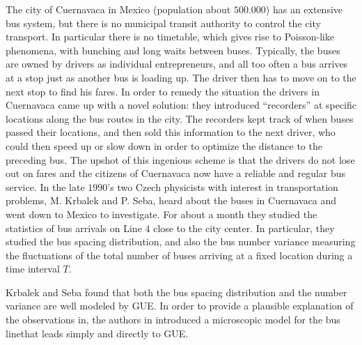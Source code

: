
The city of Cuernavaca in Mexico (population about $500.000$) has an extensive bus system, but there is no municipal transit authority to control the city transport. In particular there is no timetable, which gives rise to Poisson-like phenomena, with bunching and long waits between buses. Typically, the buses are owned by drivers as individual entrepreneurs, and all too often a bus arrives at a stop just as another bus is loading up. The driver then has to move on to the next stop to find his fares. In order to remedy the situation the drivers in Cuernavaca came up with a novel solution: they introduced “recorders” at specific locations along the bus routes in the city. The recorders kept track of when buses passed their locations, and then sold this information to the next driver, who could then speed up or slow down in order to optimize the distance to the preceding bus. The upshot of this ingenious scheme is that the drivers do not lose out on fares and the citizens of Cuernavaca now have a reliable and regular bus service. In the late $1990$’s two Czech physicists with interest in transportation problems, M. Krbalek and P. Seba, heard about the buses in Cuernavaca and went down to Mexico to investigate. For about a month they studied the statistics of bus arrivals on Line $4$ close to the city center. In particular, they studied the bus spacing distribution, and also the bus number variance measuring the fluctuations of the total number of buses arriving at a fixed location during a time interval $T$.

Krbalek and Seba found that both the bus spacing distribution and the number
variance are well modeled by GUE. In order to provide a plausible explanation of the observations in, the authors in introduced a microscopic model for the bus linethat leads simply and directly to GUE.

